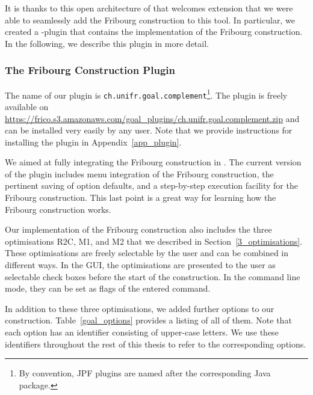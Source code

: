 It is thanks to this open architecture of \goal{} that welcomes extension that we were able to seamlessly add the Fribourg construction to this tool. In particular, we created a \goal-plugin that contains the implementation of the Fribourg construction. In the following, we describe this plugin in more detail.

\subsubsection{The Fribourg Construction Plugin}
The name of our plugin is \texttt{ch.unifr.goal.complement}\footnote{By convention, JPF plugins are named after the corresponding Java package.}. The plugin is freely available on \url{https://frico.s3.amazonaws.com/goal_plugins/ch.unifr.goal.complement.zip} and can be installed very easily by any \goal{} user. Note that we provide instructions for installing the plugin in Appendix~\ref{app_plugin}.

We aimed at fully integrating the Fribourg construction in \goal. The current version of the plugin includes menu integration of the Fribourg construction, the pertinent saving of option defaults, and a step-by-step execution facility for the Fribourg construction. This last point is a great way for learning how the Fribourg construction works.

Our implementation of the Fribourg construction also includes the three optimisations R2C, M1, and M2 that we described in Section~\ref{3_optimisations}. These optimisations are freely selectable by the user and can be combined in different ways. In the GUI, the optimisations are presented to the user as selectable check boxes before the start of the construction. In the command line mode, they can be set as flags of the entered command.

In addition to these three optimisations, we added further options to our construction. Table~\ref{goal_options} provides a listing of all of them. Note that each option has an identifier consisting of upper-case letters. We use these identifiers throughout the rest of this thesis to refer to the corresponding options.

